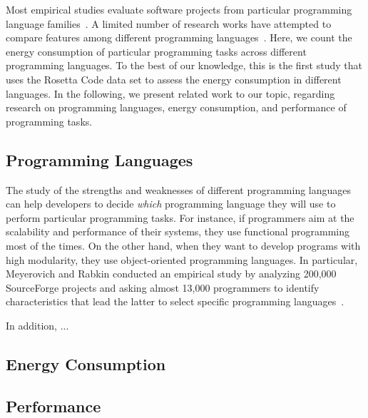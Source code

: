Most empirical studies evaluate software projects
from particular programming language families~\cite{XX}.
A limited number of research works have attempted to compare
features among different programming languages~\cite{XX}.
Here, we count the energy consumption of particular
programming tasks across different programming languages.
To the best of our knowledge,
this is the first study that uses the Rosetta Code data set
to assess the energy consumption in different languages.
In the following, we present related work to our topic,
regarding research on programming languages,
energy consumption, and performance of programming tasks.

\subsection{Programming Languages}
The study of the strengths and weaknesses of
different programming languages
can help developers to decide {\it which} programming language
they will use to perform particular programming tasks.
For instance, if programmers aim at the scalability
and performance of their systems,
they use functional programming most of the times.
On the other hand, when they want to develop
programs with high modularity,
they use object-oriented programming languages.
In particular, Meyerovich and Rabkin
conducted an empirical study by analyzing
200,000 SourceForge projects
and asking almost 13,000 programmers to
identify characteristics that lead the latter
to select specific programming languages~\cite{MR13}.

In addition, ...

\subsection{Energy Consumption}

\subsection{Performance}